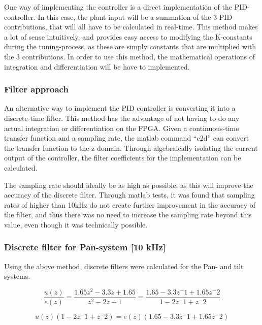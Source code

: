 One way of implementing the controller is a direct implementation of the PID-controller. In this case, the plant input will be a summation of the 3 PID contributions, that will all have to be calculated in real-time. This method makes a lot of sense intuitively, and provides easy access to modifying the K-constants during the tuning-process, as these are simply constants that are multiplied with the 3 contributions. In order to use this method, the mathematical operations of integration and differentiation will be have to implemented.


\subsubsection{Filter approach}

An alternative way to implement the PID controller is converting it into a discrete-time filter. This method has the advantage of not having to do any actual integration or differentiation on the FPGA. Given a continuous-time transfer function and a sampling rate, the matlab command “c2d” can convert the transfer function to the z-domain. Through algebraically isolating the current output of the controller, the filter coefficients for the implementation can be calculated.\par

The sampling rate should ideally be as high as possible, as this will improve the accuracy of the discrete filter. Through matlab tests, it was found that sampling rates of higher than 10kHz do not create further improvement in the accuracy of the filter, and thus there was no need to increase the sampling rate beyond this value, even though it was technically possible.

\subsubsection{Discrete filter for Pan-system [10 kHz]}

Using the above method, discrete filters were calculated for the Pan- and tilt systems.

\begin{equation}
\frac{u(z)}{e(z)}=\frac{1.65z^2-3.3z+1.65}{z^2-2z+1}=\frac{1.65-3.3z^-1+1.65z^-2}{1-2z^-1+z^-2}
\end{equation}

\begin{equation}
u(z)(1-2z^-1+z^-2)=e(z)(1.65-3.3z^-1+1.65z^-2)
\end{equation}

